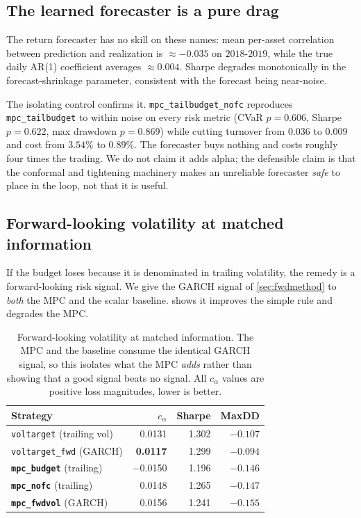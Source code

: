 \documentclass[journal]{IEEEtran}
\newcommand{\ours}[1]{\textcolor{blue!70!black}{\textbf{#1}}}
\newcommand{\best}[1]{\textbf{#1}}
\begin{document}
\subsection{The learned forecaster is a pure drag}
\label{sec:drag}

The return forecaster has no skill on these names: mean per-asset correlation
between prediction and realization is $\approx-0.035$ on $2018$-$2019$, while the
true daily AR(1) coefficient averages $\approx 0.004$. Sharpe degrades
monotonically in the forecast-shrinkage parameter, consistent with the forecast
being near-noise.

The isolating control confirms it. \texttt{mpc\_tailbudget\_nofc} reproduces
\texttt{mpc\_tailbudget} to within noise on every risk metric (CVaR $p=0.606$,
Sharpe $p=0.622$, max drawdown $p=0.869$) while cutting turnover from $0.036$ to
$0.009$ and cost from $3.54\%$ to $0.89\%$. The forecaster buys nothing and costs
roughly four times the trading. We do not claim it adds alpha; the defensible
claim is that the conformal and tightening machinery makes an unreliable
forecaster \emph{safe} to place in the loop, not that it is useful.

\subsection{Forward-looking volatility at matched information}
\label{sec:forward}

If the budget loses because it is denominated in trailing volatility, the remedy is
a forward-looking risk signal. We give the GARCH signal of \cref{sec:fwdmethod} to
\emph{both} the MPC and the scalar baseline.  shows it improves
the simple rule and degrades the MPC.

\begin{table}[!t]
  \centering
  \caption{Forward-looking volatility at matched information. The MPC and the
  baseline consume the identical GARCH signal, so this isolates what the MPC
  \emph{adds} rather than showing that a good signal beats no signal. All $c_\alpha$
  values are positive loss magnitudes, lower is better.}
  \label{tab:forward}
  \begin{tabular}{lrrr}
    \toprule
    Strategy & $c_\alpha$ & Sharpe & MaxDD \\
    \midrule
    \texttt{voltarget} (trailing vol)     & 0.0131 & 1.302 & $-0.107$ \\
    \texttt{voltarget\_fwd} (GARCH)       & \best{0.0117} & 1.299 & \best{$-0.094$} \\
    \ours{\texttt{mpc\_budget}} (trailing) & $-$0.0150 & 1.196 & $-0.146$ \\
    \ours{\texttt{mpc\_nofc}} (trailing)   & 0.0148 & 1.265 & $-0.147$ \\
    \ours{\texttt{mpc\_fwdvol}} (GARCH)    & 0.0156 & 1.241 & $-0.155$ \\
    \bottomrule
  \end{tabular}
\end{table}
\end{document}
